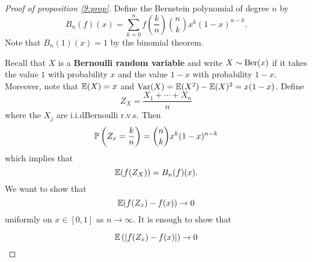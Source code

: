 \begin{proof}[Proof of proposition \ref{9:prop}]
	Define the Bernstein polynomial of degree $n$ by
	\[B_n(f)(x) = \sum_{k=0}^n f\left(\frac kn\right) \binom{n}{k} x^k (1-x)^{n-k}.\]
	Note that $B_n(1)(x) = 1$ by the binomial theorem.
	
	Recall that $X$ is a \textbf{Bernoulli random variable} and write $X \sim \operatorname{Ber}(x)$ if it takes the value $1$ with probability $x$ and the value $1-x$ with probability $1-x$.
	Moreover, note that $\mathbb{E}(X)=x$ and $\operatorname{Var}(X)=\mathbb{E}(X^2)-\mathbb{E}(X)^2=x(1-x)$.
	Define
	\[Z_X = \frac{X_1+\cdots+X_n}n\]
	where the $X_j$ are i.i.d\@ Bernoulli r.v.s.
	Then
	\[\mathbb{P}\left(Z_x = \frac kn\right) = \binom{n}{k} x^k(1-x)^{n-k}\]
	which implies that
	\[\mathbb{E}(f(Z_X)) = B_n(f)(x).\]
	We want to show that
	\[\mathbb{E}(f(Z_x)-f(x)) \to 0\]
	uniformly on $x \in [0,1]$ as $n \to \infty$.
	It is enough to show that
	
	\[\mathbb{E}\left(\left\lvert f(Z_x)-f(x) \right\rvert\right) \to 0\]
\end{proof}
